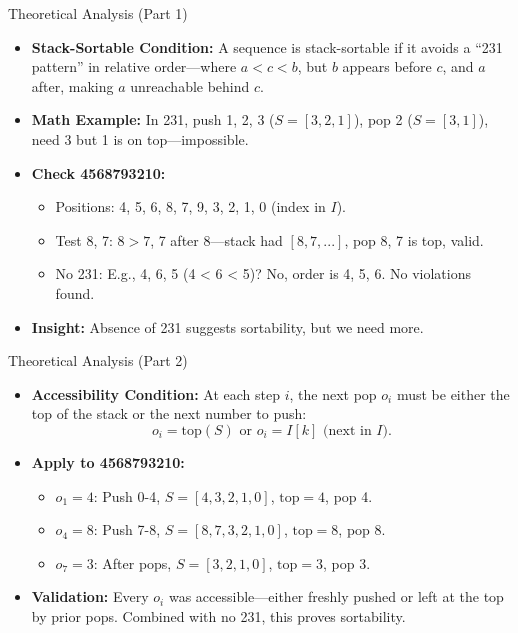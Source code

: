 \begin{frame}{Theoretical Analysis (Part 1)}
    \begin{itemize}
        \item \textbf{Stack-Sortable Condition:} A sequence is stack-sortable if it avoids a “231 pattern” in relative order—where \( a < c < b \), but \( b \) appears before \( c \), and \( a \) after, making \( a \) unreachable behind \( c \).
        \item \textbf{Math Example:} In 231, push 1, 2, 3 (\( S = [3, 2, 1] \)), pop 2 (\( S = [3, 1] \)), need 3 but 1 is on top—impossible.
        \item \textbf{Check 4568793210:}
        \begin{itemize}
            \item Positions: 4, 5, 6, 8, 7, 9, 3, 2, 1, 0 (index in \( I \)).
            \item Test 8, 7: \( 8 > 7 \), 7 after 8—stack had \( [8, 7, ...] \), pop 8, 7 is top, valid.
            \item No 231: E.g., 4, 6, 5 (4 < 6 < 5)? No, order is 4, 5, 6. No violations found.
        \end{itemize}
        \item \textbf{Insight:} Absence of 231 suggests sortability, but we need more.
    \end{itemize}
\end{frame}

\begin{frame}{Theoretical Analysis (Part 2)}
    \begin{itemize}
        \item \textbf{Accessibility Condition:} At each step \( i \), the next pop \( o_i \) must be either the top of the stack or the next number to push:
        \[
        o_i = \text{top}(S) \text{ or } o_i = I[k] \text{ (next in } I\text{)}.
        \]
        \item \textbf{Apply to 4568793210:}
        \begin{itemize}
            \item \( o_1 = 4 \): Push 0-4, \( S = [4, 3, 2, 1, 0] \), \( \text{top} = 4 \), pop 4.
            \item \( o_4 = 8 \): Push 7-8, \( S = [8, 7, 3, 2, 1, 0] \), \( \text{top} = 8 \), pop 8.
            \item \( o_7 = 3 \): After pops, \( S = [3, 2, 1, 0] \), \( \text{top} = 3 \), pop 3.
        \end{itemize}
        \item \textbf{Validation:} Every \( o_i \) was accessible—either freshly pushed or left at the top by prior pops. Combined with no 231, this proves sortability.
    \end{itemize}
\end{frame}


